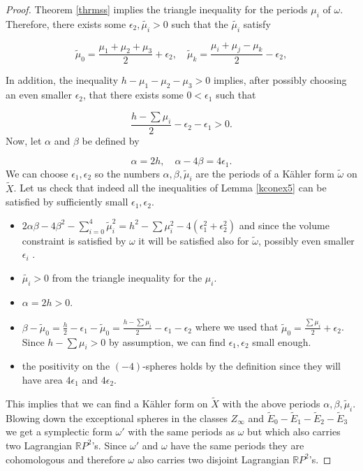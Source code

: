\begin{proof}
Theorem \ref{thrmss} implies the triangle inequality for the periods $\mu_i$ of $\omega$. Therefore, there exists some $\epsilon_2,\tilde{\mu_i}>0$ such that the $\tilde{\mu_i}$ satisfy

\[ \tilde{\mu}_0=\frac{\mu_1+\mu_2+\mu_3}{2}+\epsilon_2,\quad \tilde{\mu}_k=\frac{\mu_i+\mu_j-\mu_k}{2}-\epsilon_2,\]




In addition, the inequality $h-\mu_1-\mu_2-\mu_3>0$ implies, after possibly choosing an even smaller $\epsilon_2$, that there exists some $0<\epsilon_1$ such that

\[\frac{h-\sum\mu_i}{2}-\epsilon_2-\epsilon_1>0.\]
Now, let $\alpha$ and $\beta$ be defined by

\[\alpha=2h,\quad \alpha-4\beta=4\epsilon_1.\]
We can choose $\epsilon_1,\epsilon_2$ so the numbers $\alpha,\beta,\tilde{\mu}_i$ are the periods of a K\"ahler form $\tilde{\omega}$ on $\widetilde{X}$. Let us check that indeed all the inequalities of Lemma \ref{kconex5} can be satisfied by sufficiently small $\epsilon_1,\epsilon_2$.

\begin{itemize}
    \item $2\alpha\beta-4\beta^2-\sum^4_{i=0} \tilde{\mu}^2_i=h^2-\sum \mu_i^2 -4(\epsilon_1^2+\epsilon_2^2)$ and since the volume constraint is satisfied by $\omega$ it will be satisfied also for $\tilde{\omega}$, possibly even smaller $\epsilon_i$ .
    \item $\tilde{\mu_i}>0$ from the triangle inequality for the $\mu_i$.
    \item $\alpha=2h>0$.
    \item $\beta-\tilde{\mu}_0=\frac{h}{2}-\epsilon_1-\tilde{\mu}_0=\frac{h-\sum\mu_i}{2}-\epsilon_1-\epsilon_2$ where we used that $\tilde{\mu}_0=\frac{\sum \mu_i}{2}+\epsilon_2$. Since $h-\sum\mu_i>0$ by assumption, we can find $\epsilon_1,\epsilon_2$ small enough.
    \item the positivity on the $(-4)$-spheres holds by the definition since they will have area $4\epsilon_1$ and $4\epsilon_2$.
\end{itemize}
This implies that we can find a K\"ahler form on $\widetilde{X}$ with the above periods $\alpha,\beta,\tilde{\mu}_i$. Blowing down the exceptional spheres in the classes $Z_\infty$ and $\widetilde{E}_0-\widetilde{E}_1-\widetilde{E}_2-\widetilde{E}_3$ we get a symplectic form $\omega'$ with the same periods as $\omega$ but which also carries two Lagrangian $\mathbb{R}P^2$'s. Since $\omega'$ and $\omega$ have the same periods they are cohomologous and therefore $\omega$ also carries two disjoint Lagrangian $\mathbb{R}P^2$'s. 
\end{proof}


